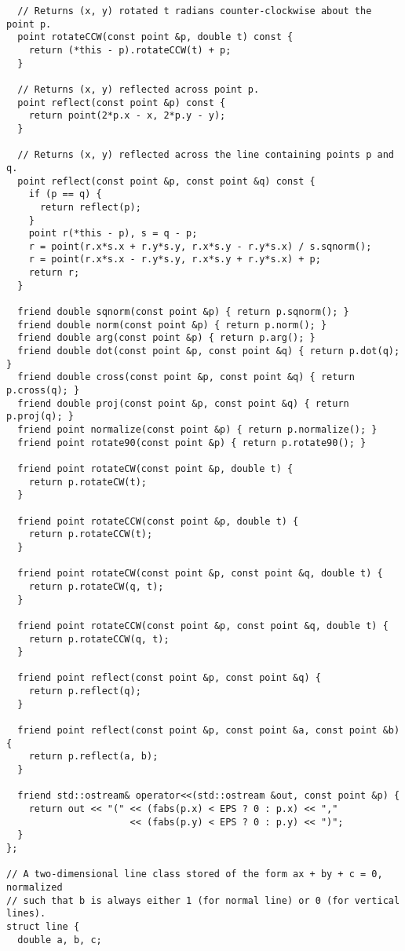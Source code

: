 \begin{lstlisting}
  // Returns (x, y) rotated t radians counter-clockwise about the point p.
  point rotateCCW(const point &p, double t) const {
    return (*this - p).rotateCCW(t) + p;
  }

  // Returns (x, y) reflected across point p.
  point reflect(const point &p) const {
    return point(2*p.x - x, 2*p.y - y);
  }

  // Returns (x, y) reflected across the line containing points p and q.
  point reflect(const point &p, const point &q) const {
    if (p == q) {
      return reflect(p);
    }
    point r(*this - p), s = q - p;
    r = point(r.x*s.x + r.y*s.y, r.x*s.y - r.y*s.x) / s.sqnorm();
    r = point(r.x*s.x - r.y*s.y, r.x*s.y + r.y*s.x) + p;
    return r;
  }

  friend double sqnorm(const point &p) { return p.sqnorm(); }
  friend double norm(const point &p) { return p.norm(); }
  friend double arg(const point &p) { return p.arg(); }
  friend double dot(const point &p, const point &q) { return p.dot(q); }
  friend double cross(const point &p, const point &q) { return p.cross(q); }
  friend double proj(const point &p, const point &q) { return p.proj(q); }
  friend point normalize(const point &p) { return p.normalize(); }
  friend point rotate90(const point &p) { return p.rotate90(); }

  friend point rotateCW(const point &p, double t) {
    return p.rotateCW(t);
  }

  friend point rotateCCW(const point &p, double t) {
    return p.rotateCCW(t);
  }

  friend point rotateCW(const point &p, const point &q, double t) {
    return p.rotateCW(q, t);
  }

  friend point rotateCCW(const point &p, const point &q, double t) {
    return p.rotateCCW(q, t);
  }

  friend point reflect(const point &p, const point &q) {
    return p.reflect(q);
  }

  friend point reflect(const point &p, const point &a, const point &b) {
    return p.reflect(a, b);
  }

  friend std::ostream& operator<<(std::ostream &out, const point &p) {
    return out << "(" << (fabs(p.x) < EPS ? 0 : p.x) << ","
                      << (fabs(p.y) < EPS ? 0 : p.y) << ")";
  }
};

// A two-dimensional line class stored of the form ax + by + c = 0, normalized
// such that b is always either 1 (for normal line) or 0 (for vertical lines).
struct line {
  double a, b, c;


\end{lstlisting}
